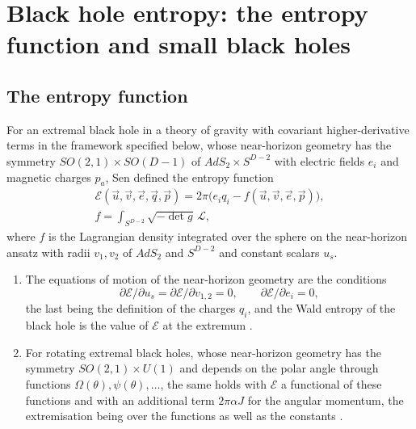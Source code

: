 \section{Black hole entropy: the entropy function and small black holes}\label{sec:entropy}

\subsection{The entropy function}\label{ssec:entropyfunction}

For an extremal black hole in a theory of gravity with covariant higher-derivative terms in the framework specified below, whose near-horizon geometry has the symmetry $SO(2,1)\times SO(D-1)$ of $AdS_2\times S^{D-2}$ with electric fields $e_i$ and magnetic charges $p_a$, Sen \cite{Sen05entropy} defined the entropy function
\begin{equation}\label{eq:entropyfunction}
\begin{gathered}
\mathcal E(\vec u,\vec v,\vec e,\vec q,\vec p) = 2\pi\big(e_i q_i - f(\vec u,\vec v,\vec e,\vec p)\big),\\
f = \int_{S^{D-2}}\sqrt{-\det g}\,\mathcal L ,
\end{gathered}
\end{equation}
where $f$ is the Lagrangian density integrated over the sphere on the near-horizon ansatz with radii $v_1,v_2$ of $AdS_2$ and $S^{D-2}$ and constant scalars $u_s$.

\begin{theorem}[claims 24, 25]\label{thm:entropyfunction}
\begin{enumerate}[label=(\roman*),leftmargin=2em]
\item The equations of motion of the near-horizon geometry are the conditions
\[
\partial\mathcal E/\partial u_s = \partial\mathcal E/\partial v_{1,2} = 0,\qquad \partial\mathcal E/\partial e_i = 0,
\]
the last being the definition of the charges $q_i$, and the Wald entropy of the black hole is the value of $\mathcal E$ at the extremum \cite{Sen05entropy}.
\item For rotating extremal black holes, whose near-horizon geometry has the symmetry $SO(2,1)\times U(1)$ and depends on the polar angle through functions $\Omega(\theta),\psi(\theta),\dots$, the same holds with $\mathcal E$ a functional of these functions and with an additional term $2\pi\alpha J$ for the angular momentum, the extremisation being over the functions as well as the constants \cite{AGJST06}.
\end{enumerate}
\end{theorem}

